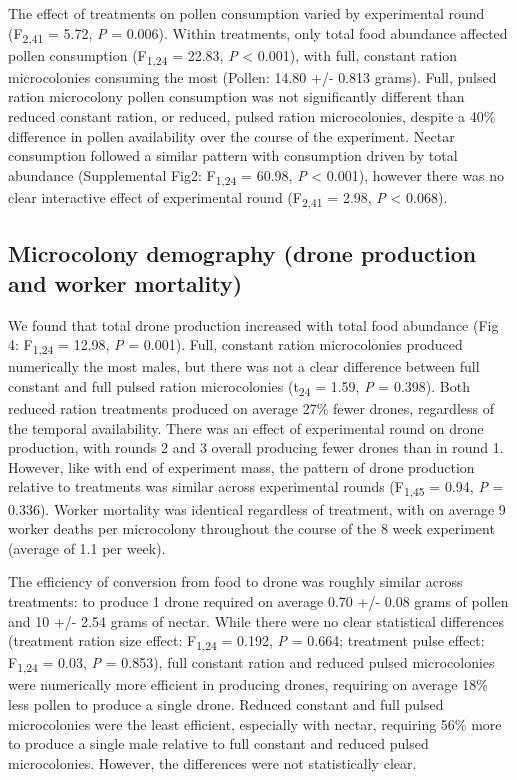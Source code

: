 \documentclass[11pt,]{article}
\begin{document}
The effect of treatments on pollen consumption varied by experimental
round (F\textsubscript{2,41} = 5.72, \emph{P} = 0.006). Within
treatments, only total food abundance affected pollen consumption
(F\textsubscript{1,24} = 22.83, \emph{P} \textless{} 0.001), with full,
constant ration microcolonies consuming the most (Pollen: 14.80 +/-
0.813 grams). Full, pulsed ration microcolony pollen consumption was not
significantly different than reduced constant ration, or reduced, pulsed
ration microcolonies, despite a 40\% difference in pollen availability
over the course of the experiment. Nectar consumption followed a similar
pattern with consumption driven by total abundance (Supplemental Fig2:
F\textsubscript{1,24} = 60.98, \emph{P} \textless{} 0.001), however
there was no clear interactive effect of experimental round
(F\textsubscript{2,41} = 2.98, \emph{P} \textless{} 0.068).

\hypertarget{microcolony-demography-drone-production-and-worker-mortality}{%
\subsection{Microcolony demography (drone production and worker
mortality)}\label{microcolony-demography-drone-production-and-worker-mortality}}

We found that total drone production increased with total food abundance
(Fig 4: F\textsubscript{1,24} = 12.98, \emph{P} = 0.001). Full, constant
ration microcolonies produced numerically the most males, but there was
not a clear difference between full constant and full pulsed ration
microcolonies (t\textsubscript{24} = 1.59, \emph{P} = 0.398). Both
reduced ration treatments produced on average 27\% fewer drones,
regardless of the temporal availability. There was an effect of
experimental round on drone production, with rounds 2 and 3 overall
producing fewer drones than in round 1. However, like with end of
experiment mass, the pattern of drone production relative to treatments
was similar across experimental rounds (F\textsubscript{1,45} = 0.94,
\emph{P} = 0.336). Worker mortality was identical regardless of
treatment, with on average 9 worker deaths per microcolony throughout
the course of the 8 week experiment (average of 1.1 per week).

The efficiency of conversion from food to drone was roughly similar
across treatments: to produce 1 drone required on average 0.70 +/- 0.08
grams of pollen and 10 +/- 2.54 grams of nectar. While there were no
clear statistical differences (treatment ration size effect:
F\textsubscript{1,24} = 0.192, \emph{P} = 0.664; treatment pulse effect:
F\textsubscript{1,24} = 0.03, \emph{P} = 0.853), full constant ration
and reduced pulsed microcolonies were numerically more efficient in
producing drones, requiring on average 18\% less pollen to produce a
single drone. Reduced constant and full pulsed microcolonies were the
least efficient, especially with nectar, requiring 56\% more to produce
a single male relative to full constant and reduced pulsed
microcolonies. However, the differences were not statistically clear.
\end{document}
